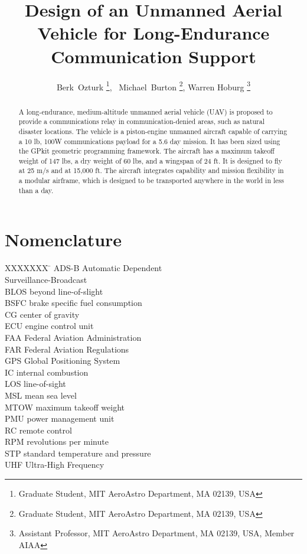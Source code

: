 \documentclass[journal]{aiaa-tc}%
\title{Design of an Unmanned Aerial Vehicle for Long-Endurance Communication Support}
\author{Berk~Ozturk
    \thanks{Graduate Student, MIT AeroAstro Department, MA 02139, USA},
    ~Michael~Burton
    \thanks{Graduate Student, MIT AeroAstro Department, MA 02139, USA},
    Warren Hoburg
    \thanks{Assistant Professor, MIT AeroAstro Department, MA 02139, USA, Member AIAA }
    }
\begin{document}
\maketitle

\begin{abstract}

    A long-endurance, medium-altitude unmanned aerial vehicle (UAV) is proposed to provide a communications relay in communication-denied areas, such as natural disaster locations. The vehicle is a piston-engine unmanned aircraft capable of carrying a 10 lb, 100W communications payload for a 5.6 day mission. It has been sized using the GPkit geometric programming framework.  The aircraft has a maximum takeoff weight of 147 lbs,  a dry weight of 60 lbs, and a wingspan of 24 ft.  It is designed to fly at 25 m/s and at 15,000 ft.  The aircraft integrates capability and mission flexibility in a modular airframe, which is designed to be transported anywhere in the world in less than a day. 

\end{abstract}

\section*{Nomenclature}
\begin{multicols}{2}
\begin{tabbing}
  XXXXXXX \= \kill%
ADS-B \> Automatic Dependent \\
\>Surveillance-Broadcast\\
BLOS \> beyond line-of-slight\\
BSFC \> brake specific fuel consumption\\
CG \> center of gravity\\
ECU \> engine control unit\\
FAA \> Federal Aviation Administration\\
FAR \> Federal Aviation Regulations\\
GPS \> Global Positioning System\\
IC \> internal combustion\\
LOS \> line-of-sight\\
MSL \> mean sea level\\
MTOW \> maximum takeoff weight\\
PMU \> power management unit\\
RC \> remote control\\
RPM \> revolutions per minute\\
STP \> standard temperature and pressure\\
UHF \> Ultra-High Frequency\\

 \end{tabbing}
\end{multicols}
\end{document}
